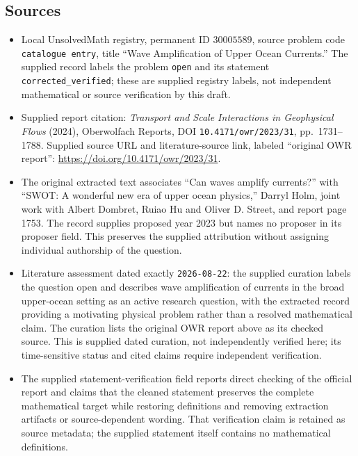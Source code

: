 \documentclass[11pt]{article}
\begin{document}
\subsection{Sources}
\begin{itemize}
\item Local UnsolvedMath registry, permanent ID \(30005589\), source problem code \texttt{catalogue entry}, title ``Wave Amplification of Upper Ocean Currents.'' The supplied record labels the problem \texttt{open} and its statement \texttt{corrected\_verified}; these are supplied registry labels, not independent mathematical or source verification by this draft.
\item Supplied report citation: \emph{Transport and Scale Interactions in Geophysical Flows} (2024), Oberwolfach Reports, DOI \texttt{10.4171/owr/2023/31}, pp.\ 1731--1788. Supplied source URL and literature-source link, labeled ``original OWR report'': \url{https://doi.org/10.4171/owr/2023/31}.
\item The original extracted text associates ``Can waves amplify currents?'' with ``SWOT: A wonderful new era of upper ocean physics,'' Darryl Holm, joint work with Albert Dombret, Ruiao Hu and Oliver D. Street, and report page 1753. The record supplies proposed year 2023 but names no proposer in its proposer field. This preserves the supplied attribution without assigning individual authorship of the question.
\item Literature assessment dated exactly \texttt{2026-08-22}: the supplied curation labels the question open and describes wave amplification of currents in the broad upper-ocean setting as an active research question, with the extracted record providing a motivating physical problem rather than a resolved mathematical claim. The curation lists the original OWR report above as its checked source. This is supplied dated curation, not independently verified here; its time-sensitive status and cited claims require independent verification.
\item The supplied statement-verification field reports direct checking of the official report and claims that the cleaned statement preserves the complete mathematical target while restoring definitions and removing extraction artifacts or source-dependent wording. That verification claim is retained as source metadata; the supplied statement itself contains no mathematical definitions.
\end{itemize}
\end{document}
